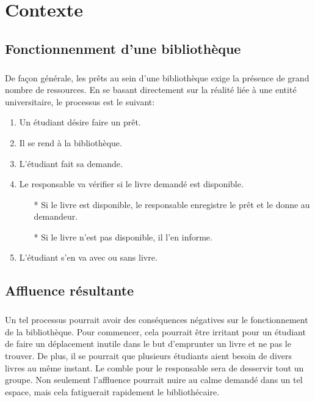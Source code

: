 \chapter{Contexte}
    \section{Fonctionnenment d'une bibliothèque}
\paragraph{}
De façon générale, les prêts au sein d'une bibliothèque
exige la présence de grand nombre de ressources. En se 
basant directement sur la réalité liée à une entité
universitaire, le processus est le suivant: \par 
\begin{enumerate}
    \item Un étudiant désire faire un prêt.
    \item Il se rend à la bibliothèque.
    \item L'étudiant fait sa demande.
    \item Le responsable va vérifier si le livre demandé est disponible.
    \begin{itemize}
        \item[*] Si le livre est disponible, le responsable enregistre le prêt 
        et le donne au demandeur.
        \item[*] Si le livre n'est pas disponible, il l'en informe.
    \end{itemize} 
    \item L'étudiant s'en va avec ou sans livre.
\end{enumerate}

    \section{Affluence résultante}
\paragraph{}
Un tel processus pourrait avoir des conséquences négatives
sur le fonctionnement de la bibliothèque. Pour commencer, cela pourrait
être irritant pour un étudiant de faire un déplacement inutile
dans le but d'emprunter un livre et ne pas le trouver. De plus, 
il se pourrait que plusieurs étudiants aient besoin de divers livres
au même instant. Le comble pour le responsable sera de desservir tout 
un groupe. Non seulement l'affluence pourrait nuire au calme demandé
dans un tel espace, mais cela fatiguerait rapidement le bibliothécaire.
    
